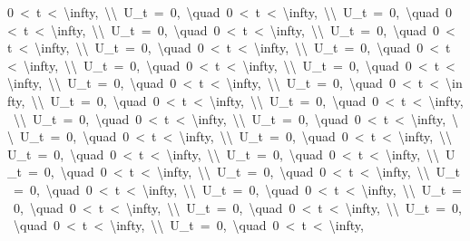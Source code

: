 \documentclass[
  ukrainian,
]{article}
\begin{document}
0\ \textless{}\ t\ \textless{}\ \textbackslash{}infty,\ \textbackslash{}\textbackslash{}\ U\_t\ =\ 0,\ \textbackslash{}quad\ 0\ \textless{}\ t\ \textless{}\ \textbackslash{}infty,\ \textbackslash{}\textbackslash{}\ U\_t\ =\ 0,\ \textbackslash{}quad\ 0\ \textless{}\ t\ \textless{}\ \textbackslash{}infty,\ \textbackslash{}\textbackslash{}\ U\_t\ =\ 0,\ \textbackslash{}quad\ 0\ \textless{}\ t\ \textless{}\ \textbackslash{}infty,\ \textbackslash{}\textbackslash{}\ U\_t\ =\ 0,\ \textbackslash{}quad\ 0\ \textless{}\ t\ \textless{}\ \textbackslash{}infty,\ \textbackslash{}\textbackslash{}\ U\_t\ =\ 0,\ \textbackslash{}quad\ 0\ \textless{}\ t\ \textless{}\ \textbackslash{}infty,\ \textbackslash{}\textbackslash{}\ U\_t\ =\ 0,\ \textbackslash{}quad\ 0\ \textless{}\ t\ \textless{}\ \textbackslash{}infty,\ \textbackslash{}\textbackslash{}\ U\_t\ =\ 0,\ \textbackslash{}quad\ 0\ \textless{}\ t\ \textless{}\ \textbackslash{}infty,\ \textbackslash{}\textbackslash{}\ U\_t\ =\ 0,\ \textbackslash{}quad\ 0\ \textless{}\ t\ \textless{}\ \textbackslash{}infty,\ \textbackslash{}\textbackslash{}\ U\_t\ =\ 0,\ \textbackslash{}quad\ 0\ \textless{}\ t\ \textless{}\ \textbackslash{}infty,\ \textbackslash{}\textbackslash{}\ U\_t\ =\ 0,\ \textbackslash{}quad\ 0\ \textless{}\ t\ \textless{}\ \textbackslash{}infty,\ \textbackslash{}\textbackslash{}\ U\_t\ =\ 0,\ \textbackslash{}quad\ 0\ \textless{}\ t\ \textless{}\ \textbackslash{}infty,\ \textbackslash{}\textbackslash{}\ U\_t\ =\ 0,\ \textbackslash{}quad\ 0\ \textless{}\ t\ \textless{}\ \textbackslash{}infty,\ \textbackslash{}\textbackslash{}\ U\_t\ =\ 0,\ \textbackslash{}quad\ 0\ \textless{}\ t\ \textless{}\ \textbackslash{}infty,\ \textbackslash{}\textbackslash{}\ U\_t\ =\ 0,\ \textbackslash{}quad\ 0\ \textless{}\ t\ \textless{}\ \textbackslash{}infty,\ \textbackslash{}\textbackslash{}\ U\_t\ =\ 0,\ \textbackslash{}quad\ 0\ \textless{}\ t\ \textless{}\ \textbackslash{}infty,\ \textbackslash{}\textbackslash{}\ U\_t\ =\ 0,\ \textbackslash{}quad\ 0\ \textless{}\ t\ \textless{}\ \textbackslash{}infty,\ \textbackslash{}\textbackslash{}\ U\_t\ =\ 0,\ \textbackslash{}quad\ 0\ \textless{}\ t\ \textless{}\ \textbackslash{}infty,\ \textbackslash{}\textbackslash{}\ U\_t\ =\ 0,\ \textbackslash{}quad\ 0\ \textless{}\ t\ \textless{}\ \textbackslash{}infty,\ \textbackslash{}\textbackslash{}\ U\_t\ =\ 0,\ \textbackslash{}quad\ 0\ \textless{}\ t\ \textless{}\ \textbackslash{}infty,\ \textbackslash{}\textbackslash{}\ U\_t\ =\ 0,\ \textbackslash{}quad\ 0\ \textless{}\ t\ \textless{}\ \textbackslash{}infty,\ \textbackslash{}\textbackslash{}\ U\_t\ =\ 0,\ \textbackslash{}quad\ 0\ \textless{}\ t\ \textless{}\ \textbackslash{}infty,\ \textbackslash{}\textbackslash{}\ U\_t\ =\ 0,\ \textbackslash{}quad\ 0\ \textless{}\ t\ \textless{}\ \textbackslash{}infty,\ \textbackslash{}\textbackslash{}\ U\_t\ =\ 0,\ \textbackslash{}quad\ 0\ \textless{}\ t\ \textless{}\ \textbackslash{}infty,\ \textbackslash{}\textbackslash{}\ U\_t\ =\ 0,\ \textbackslash{}quad\ 0\ \textless{}\ t\ \textless{}\ \textbackslash{}infty,\ \textbackslash{}\textbackslash{}\ U\_t\ =\ 0,\ \textbackslash{}quad\ 0\ \textless{}\ t\ \textless{}\ \textbackslash{}infty,\ \textbackslash{}\textbackslash{}\ U\_t\ =\ 0,\ \textbackslash{}quad\ 0\ \textless{}\ t\ \textless{}\ \textbackslash{}infty,\ 
\end{document}
